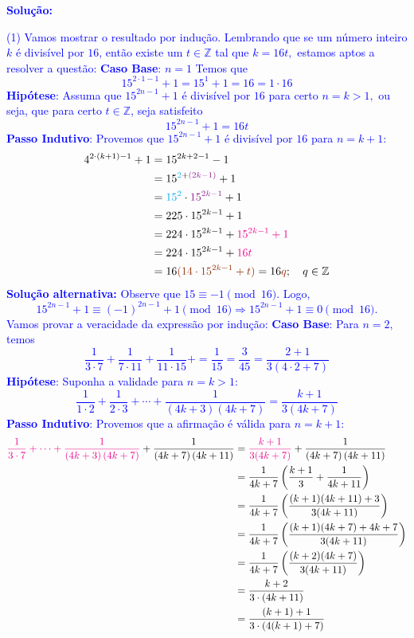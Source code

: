 \documentclass[oneside,a4paper,12pt]{article}
\newcommand{\negrito}[1]{\mbox{\boldmath{$#1$}}}
\newcommand{\Z}{\mathbb{Z}}
\theoremstyle{Colorido}
\theoremstyle{solu}
\theoremstyle{dotlessP}
\newcommand{\solucao}[1]{\textcolor{blue}{\textbf{Solução:} #1}}
\begin{document}
\solucao{\begin{tasks}[counter-format={(tsk[a])},label-width=3.6ex, label-format = {\bfseries}, column-sep = {20pt}](1)
\task[\textcolor{blue}{$\negrito{(a)} $}] Vamos mostrar o resultado por indução. Lembrando que se um número inteiro $k$ é divisível por $16$, então existe um $t \in \mathbb{Z}$ tal que $k = 16t,$ estamos aptos a resolver a questão:\newline
\textbf{Caso Base}: $n=1$
Temos que
$$15^{2\cdot1-1}+1=15^{1}+1=16=1\cdot16$$
\textbf{Hipótese}: Assuma que $15^{2n-1} + 1$ é divisível por $16$ para certo $n=k>1,$ ou seja, que para certo $t \in \Z$, seja satisfeito
$$15^{2n-1} + 1=16t$$
\textbf{Passo Indutivo}: Provemos que $15^{2n-1} + 1$ é divisível por $16$ para $n=k+1:$
\begin{align*}4^{2\cdot \left( k+1 \right) -1}+1&=15^{2k+2-1}-1\\&= 15^{\textcolor{Cyan}{2} + \textcolor{Plum}{(2k - 1)}} + 1\\&=\textcolor{Cyan}{15^2} \cdot \textcolor{Plum}{15^{2k-1}} + 1 \\&=225\cdot15^{2k-1}+1\\&=224 \cdot 15^{2k-1} + \textcolor{Magenta}{15^{2k-1} + 1}\\&=  224 \cdot 15^{2k-1} + \textcolor{Magenta}{16t}\\&= 16\textcolor{RawSienna}{(14 \cdot 15^{2k-1} + t)} =16\textcolor{RawSienna}{q};\quad  q \in \Z
\end{align*}
\textbf{Solução alternativa:} Observe que $15 \equiv -1 \pmod{16}.$ Logo, \[15^{2n-1} + 1 \equiv (-1)^{2n-1} + 1 \pmod{16} \Rightarrow 15^{2n-1} + 1 \equiv 0 \pmod{16}.\]
\task[\textcolor{blue}{$\negrito{(b)} $}] Vamos provar a veracidade da expressão por indução:\newline
\textbf{Caso Base}: Para $n=2,$ temos
$$\frac{1}{3\cdot 7}+\frac{1}{7\cdot 11}+\frac{1}{11\cdot 15}+ =\frac{1}{15}=\frac{3}{45}=\frac{2+1}{3(4 \cdot 2 + 7)}$$
\textbf{Hipótese}: Suponha a validade para $n=k>1:$
$$\frac{1}{1\cdot2}+\frac{1}{2\cdot3}+ \cdots +\frac{1}{(4k+3) \left( 4k+7 \right) }=\frac{k+1}{3(4k+7)}$$
\textbf{Passo Indutivo}: Provemos que a afirmação é válida para $n=k+1:$
\begin{align*}
\textcolor{Magenta}{\frac{1}{3\cdot7}+ \cdots +\frac{1}{(4k+3) \left( 4k+7 \right) }}+\frac{1}{ \left( 4k+7 \right)  \left( 4k+11 \right) }&=\textcolor{Magenta}{\frac{k+1}{3(4k+7)}}+\frac{1}{ \left( 4k+7 \right)  \left( 4k+11 \right) }\\&=\frac{1}{4k+7} \left(\frac{k+1}{3} + \frac{1}{4k+11} \right)\\&=\frac{1}{4k+7} \left(\frac{(k+1)(4k+11) + 3}{3(4k+11)} \right) \\&=\frac{1}{4k+7} \left(\frac{(k+1)(4k+7) + 4k+7}{3(4k+11)} \right)\\&=\frac{1}{4k+7} \left(\frac{(k+2)(4k+7)}{3(4k+11)} \right)\\&= \dfrac{k+2}{3\cdot (4k+11)}\\&= \dfrac{(k+1)+1}{3\cdot (4(k+1)+7)}

\end{align*}
\end{tasks}}
\end{document}
